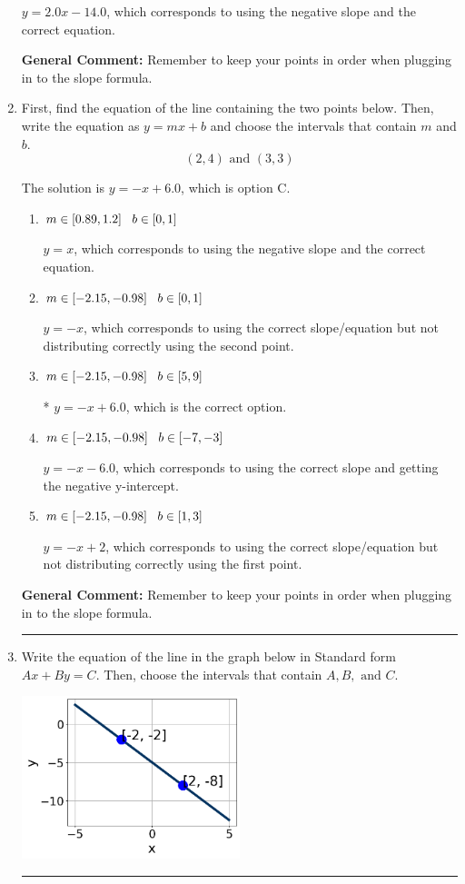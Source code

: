 \documentclass{extbook}[14pt]
\newcommand{\litem}[1]{\item #1

\rule{\textwidth}{0.4pt}}
\begin{document}
\begin{enumerate}
{\begin{enumerate}[label=\Alph*.]
 $y = 2.0x -14.0$, which corresponds to using the negative slope and the correct equation.
\end{enumerate}

\textbf{General Comment:} Remember to keep your points in order when plugging in to the slope formula.
}
\litem{
First, find the equation of the line containing the two points below. Then, write the equation as $ y=mx+b $ and choose the intervals that contain $m$ and $b$.
\[ (2, 4) \text{ and } (3, 3) \]

The solution is \( y = -x + 6.0 \), which is option C.\begin{enumerate}[label=\Alph*.]
\item \( m \in [0.89, 1.2] \hspace*{3mm} b \in [0, 1] \)

 $y = x$, which corresponds to using the negative slope and the correct equation.
\item \( m \in [-2.15, -0.98] \hspace*{3mm} b \in [0, 1] \)

 $y = -x$, which corresponds to using the correct slope/equation but not distributing correctly using the second point.
\item \( m \in [-2.15, -0.98] \hspace*{3mm} b \in [5, 9] \)

* $y = -x + 6.0$, which is the correct option.
\item \( m \in [-2.15, -0.98] \hspace*{3mm} b \in [-7, -3] \)

 $y = -x -6.0$, which corresponds to using the correct slope and getting the negative y-intercept.
\item \( m \in [-2.15, -0.98] \hspace*{3mm} b \in [1, 3] \)

 $y = -x + 2$, which corresponds to using the correct slope/equation but not distributing correctly using the first point.
\end{enumerate}

\textbf{General Comment:} Remember to keep your points in order when plugging in to the slope formula.
}
\litem{
Write the equation of the line in the graph below in Standard form $Ax+By=C$. Then, choose the intervals that contain $A, B, \text{ and } C$.

\begin{center}
    \includegraphics[width=0.5\textwidth]{../Figures/linearGraphToStandardC.png}
\end{center}




}
\end{enumerate}
\end{document}
